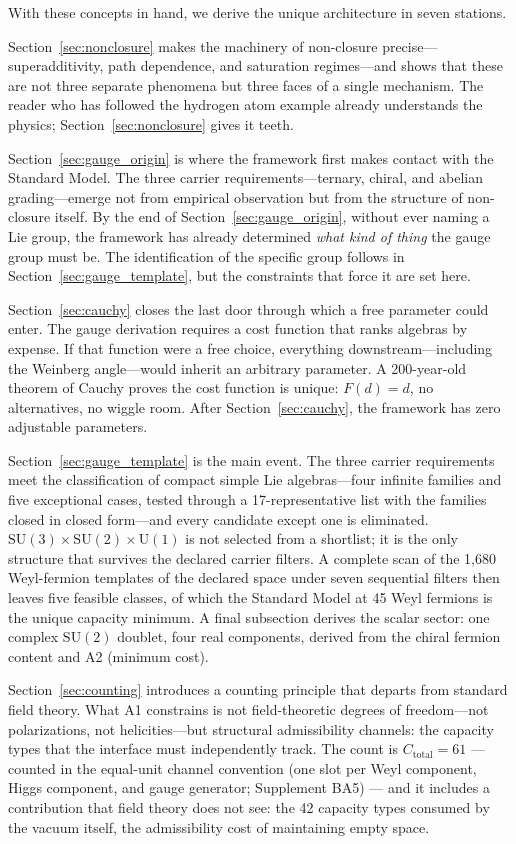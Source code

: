 \documentclass[11pt]{article}
\newcommand{\SU}{\mathrm{SU}}
\newcommand{\U}{\mathrm{U}}
\begin{document}
With these concepts in hand, we derive the unique architecture in seven stations.

Section~\ref{sec:nonclosure} makes the machinery of non-closure precise---superadditivity, path dependence, and saturation regimes---and shows that these are not three separate phenomena but three faces of a single mechanism.  The reader who has followed the hydrogen atom example already understands the physics; Section~\ref{sec:nonclosure} gives it teeth.

Section~\ref{sec:gauge_origin} is where the framework first makes contact with the Standard Model.  The three carrier requirements---ternary, chiral, and abelian grading---emerge not from empirical observation but from the structure of non-closure itself.  By the end of Section~\ref{sec:gauge_origin}, without ever naming a Lie group, the framework has already determined \emph{what kind of thing} the gauge group must be.  The identification of the specific group follows in Section~\ref{sec:gauge_template}, but the constraints that force it are set here.

Section~\ref{sec:cauchy} closes the last door through which a free parameter could enter.  The gauge derivation requires a cost function that ranks algebras by expense.  If that function were a free choice, everything downstream---including the Weinberg angle---would inherit an arbitrary parameter.  A 200-year-old theorem of Cauchy proves the cost function is unique: $F(d) = d$, no alternatives, no wiggle room.  After Section~\ref{sec:cauchy}, the framework has zero adjustable parameters.

Section~\ref{sec:gauge_template} is the main event.  The three carrier requirements meet the classification of compact simple Lie algebras---four infinite families and five exceptional cases, tested through a 17-representative list with the families closed in closed form---and every candidate except one is eliminated.  $\SU(3) \times \SU(2) \times \U(1)$ is not selected from a shortlist; it is the only structure that survives the declared carrier filters.  A complete scan of the 1{,}680 Weyl-fermion templates of the declared space under seven sequential filters then leaves five feasible classes, of which the Standard Model at 45 Weyl fermions is the unique capacity minimum.  A final subsection derives the scalar sector: one complex $\SU(2)$ doublet, four real components, derived from the chiral fermion content and A2 (minimum cost).

Section~\ref{sec:counting} introduces a counting principle that departs from standard field theory.  What A1 constrains is not field-theoretic degrees of freedom---not polarizations, not helicities---but structural admissibility channels: the capacity types that the interface must independently track.  The count is $C_{\mathrm{total}} = 61$ --- counted in the equal-unit channel convention (one slot per Weyl component, Higgs component, and gauge generator; Supplement BA5) --- and it includes a contribution that field theory does not see: the 42 capacity types consumed by the vacuum itself, the admissibility cost of maintaining empty space.
\end{document}
